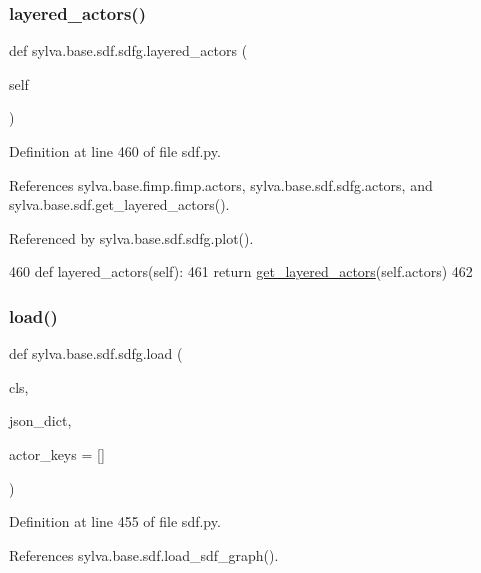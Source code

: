 \subsubsection{\texorpdfstring{layered\+\_\+actors()}{layered\_actors()}}
{\footnotesize\ttfamily def sylva.\+base.\+sdf.\+sdfg.\+layered\+\_\+actors (\begin{DoxyParamCaption}\item[{}]{self }\end{DoxyParamCaption})}



Definition at line 460 of file sdf.\+py.



References sylva.\+base.\+fimp.\+fimp.\+actors, sylva.\+base.\+sdf.\+sdfg.\+actors, and sylva.\+base.\+sdf.\+get\+\_\+layered\+\_\+actors().



Referenced by sylva.\+base.\+sdf.\+sdfg.\+plot().


\begin{DoxyCode}
460         \textcolor{keyword}{def }layered\_actors(self):
461             \textcolor{keywordflow}{return} \hyperlink{namespacesylva_1_1base_1_1sdf_a1e0fb379d9b6a1f2adb650611bdb49e6}{get\_layered\_actors}(self.actors)
462 
\end{DoxyCode}
\mbox{\label{classsylva_1_1base_1_1sdf_1_1sdfg_abdac55d55690dc28e8cbd5dcaf05493c}} 
\subsubsection{\texorpdfstring{load()}{load()}}
{\footnotesize\ttfamily def sylva.\+base.\+sdf.\+sdfg.\+load (\begin{DoxyParamCaption}\item[{}]{cls,  }\item[{}]{json\+\_\+dict,  }\item[{}]{actor\+\_\+keys = {\ttfamily \mbox{[}\mbox{]}} }\end{DoxyParamCaption})}



Definition at line 455 of file sdf.\+py.



References sylva.\+base.\+sdf.\+load\+\_\+sdf\+\_\+graph().



